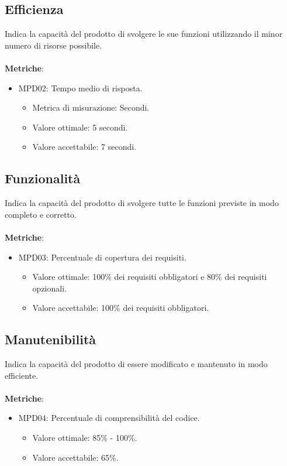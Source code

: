\documentclass[12pt]{article}
\begin{document}
\subsection{Efficienza}
	Indica la capacità del prodotto di svolgere le sue funzioni utilizzando il minor numero di risorse possibile.
	\\\\
	\textbf{Metriche}:
	\begin{itemize}
		\item MPD02: Tempo medio di risposta.
		\begin{itemize}	
			\item Metrica di misurazione: Secondi.
			\item Valore ottimale: 5 secondi.
			\item Valore accettabile: 7 secondi.
		\end{itemize}
	\end{itemize}

\subsection{Funzionalità}

	Indica la capacità del prodotto di svolgere tutte le funzioni previste in modo completo e corretto.
	\\\\
	\textbf{Metriche}:
	\begin{itemize}
		\item MPD03: Percentuale di copertura dei requisiti.
		\begin{itemize}	
			\item Valore ottimale: 100\% dei requisiti obbligatori e 80\% dei requisiti opzionali.
			\item Valore accettabile: 100\% dei requisiti obbligatori.
		\end{itemize}
	\end{itemize}

\subsection{Manutenibilità}
	Indica la capacità del prodotto di essere modificato e mantenuto in modo efficiente.
	\\\\
	\textbf{Metriche}:
		\begin{itemize}
			\item MPD04: Percentuale di comprensibilità del codice.
			\begin{itemize}	
				\item Valore ottimale: 85\% - 100\%.
				\item Valore accettabile: 65\%.
			\end{itemize}
		\end{itemize}
\end{document}

